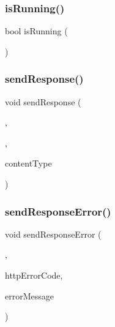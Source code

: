 \mbox{\label{namespaceHttpServer_a40e5881f9c001c5cc38554084751adbc}} 
\subsubsection{\texorpdfstring{is\+Running()}{isRunning()}}
{\footnotesize\ttfamily bool is\+Running (\begin{DoxyParamCaption}{ }\end{DoxyParamCaption})}

\mbox{\label{namespaceHttpServer_ab52918227ce3e9fc7307919ec5cfb8c4}} 
\subsubsection{\texorpdfstring{send\+Response()}{sendResponse()}}
{\footnotesize\ttfamily void send\+Response (\begin{DoxyParamCaption}\item[{const \mbox{\hyperlink{classGEvent}{G\+Event}} \&}]{,  }\item[{const std\+::string \&}]{,  }\item[{const std\+::string \&}]{content\+Type }\end{DoxyParamCaption})}

\mbox{\label{namespaceHttpServer_aa02b158d679b621a57424226abddb2f3}} 
\subsubsection{\texorpdfstring{send\+Response\+Error()}{sendResponseError()}}
{\footnotesize\ttfamily void send\+Response\+Error (\begin{DoxyParamCaption}\item[{const \mbox{\hyperlink{classGEvent}{G\+Event}} \&}]{,  }\item[{int}]{http\+Error\+Code,  }\item[{const std\+::string \&}]{error\+Message }\end{DoxyParamCaption})}


